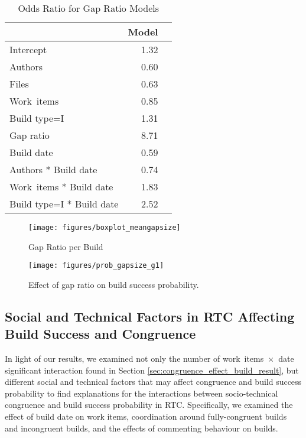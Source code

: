 \begin{table}[t]
\begin{center}
\caption{Odds Ratio for Gap Ratio Models}
\begin{tabular}{lrr}
  \toprule
 & Model\\ 
  \midrule
Intercept & 1.32 \\ 
  Authors &  0.60 \\ 
  Files &  0.63 \\ 
  Work~items  & 0.85 \\ 
  Build type=I  & 1.31 \\ 
  Gap ratio  & 8.71 \\ 
  Build date  & 0.59 \\ 
  Authors * Build date & 0.74 \\ 
  Work~items * Build date  & 1.83 \\ 
  Build type=I * Build date  & 2.52 \\ 
   \bottomrule
\end{tabular}
\label{tab:oddsratio_gapsize}
\end{center}
\end{table}


\begin{figure}[t]
	\centering	
	\texttt{[image: figures/boxplot\_meangapsize]}
	\caption{Gap Ratio per Build}
	\label{fig:gapsizes}
\end{figure}

\begin{figure}[t]
	\centering
	\texttt{[image: figures/prob\_gapsize\_g1]}
	\caption{Effect of gap ratio on build success probability. }
	\label{fig:prob_gapsize_a}
\end{figure}




\subsection{Social and Technical Factors in RTC Affecting Build Success and Congruence}
\label{sec:otherfactors}
In light of our results, we examined not only the number of work~items~$\times$~date significant interaction found in Section \ref{sec:congruence_effect_build_result}, but different social and technical factors that may affect congruence
and build success probability to find explanations for the interactions between socio-technical congruence and build success probability in RTC.
Specifically, we examined the effect of build date on work items, coordination around fully-congruent builds and
incongruent builds, and the effects of commenting behaviour on builds.

